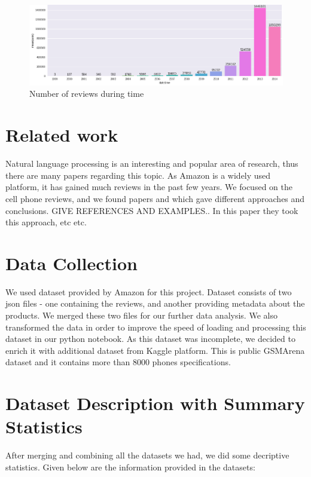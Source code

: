 \documentclass[11pt]{article}
\begin{document}
\begin{figure}[h!]
  \centering
    \includegraphics[width=\linewidth]{reviewsByTime.png}
  \caption{Number of reviews during time}
  \label{fig:reviewsByTime}
\end{figure}


\section{Related work}
Natural language processing is an interesting and popular area of research, thus there are many papers regarding this topic. As Amazon is a widely used platform, it has gained much reviews in the past few years. We focused on the cell phone reviews, and we found papers and which gave different approaches and conclusions. GIVE REFERENCES AND EXAMPLES.. In this paper they took this approach, etc etc.


\section{Data Collection}
We used dataset provided by Amazon for this project. Dataset consists of two json files - one containing the reviews, and another providing metadata about the products. We merged these two files for our further data analysis. We also transformed the data in order to improve the speed of loading and processing this dataset in our python notebook. As this dataset was incomplete, we decided to enrich it with additional dataset from Kaggle platform. This is public GSMArena dataset and it contains more than 8000 phones specifications.


\section{Dataset Description with Summary Statistics}
After merging and combining all the datasets we had, we did some decriptive statistics. Given below are the information provided in the datasets:
\end{document}
